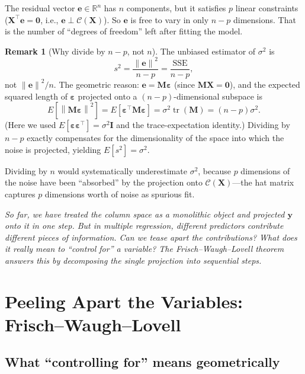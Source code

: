 \documentclass[11pt,a4paper]{article}
\theoremstyle{plain}
\theoremstyle{definition}
\newtheorem{remark}[theorem]{Remark}
\newcommand{\R}{\mathbb{R}}
\newcommand{\bX}{\bm{X}}
\newcommand{\by}{\bm{y}}
\newcommand{\be}{\bm{e}}
\newcommand{\bM}{\bm{M}}
\newcommand{\bI}{\bm{I}}
\newcommand{\Col}{\mathcal{C}}
\newcommand{\norm}[1]{\left\lVert #1 \right\rVert}
\DeclareMathOperator{\tr}{tr}
\begin{document}
The residual vector $\be\in\R^n$ has $n$ components, but it satisfies $p$
linear constraints ($\bX^\top\be = \bm{0}$, i.e., $\be\perp\Col(\bX)$).
So $\be$ is free to vary in only $n - p$ dimensions.
That is the number of ``degrees of freedom'' left after fitting the model.

\begin{remark}[Why divide by $n-p$, not $n$]
The unbiased estimator of $\sigma^2$ is
\[
  s^2 = \frac{\norm{\be}^2}{n - p} = \frac{\text{SSE}}{n-p},
\]
not $\norm{\be}^2/n$.  The geometric reason: $\be = \bM\bm{\varepsilon}$
(since $\bM\bX = \bm{0}$), and the expected squared length of
$\bm{\varepsilon}$ projected onto a $(n-p)$-dimensional subspace is
\[
  E[\norm{\bM\bm{\varepsilon}}^2]
  = E[\bm{\varepsilon}^\top\bM\bm{\varepsilon}]
  = \sigma^2\tr(\bM)
  = (n-p)\sigma^2.
\]
(Here we used $E[\bm{\varepsilon}\bm{\varepsilon}^\top] = \sigma^2\bI$
and the trace-expectation identity.)
Dividing by $n-p$ exactly compensates for the dimensionality of the
space into which the noise is projected, yielding $E[s^2] = \sigma^2$.

Dividing by $n$ would systematically underestimate $\sigma^2$, because
$p$ dimensions of the noise have been ``absorbed'' by the projection
onto $\Col(\bX)$---the hat matrix captures $p$ dimensions worth of noise
as spurious fit.
\end{remark}

\medskip
\noindent\textit{So far, we have treated the column space as a monolithic
object and projected $\by$ onto it in one step.
But in multiple regression, different predictors contribute different
pieces of information.
Can we tease apart the contributions?
What does it really mean to ``control for'' a variable?
The Frisch--Waugh--Lovell theorem answers this by decomposing the
single projection into sequential steps.}


\section{Peeling Apart the Variables: Frisch--Waugh--Lovell}\label{sec:fwl}

\subsection{What ``controlling for'' means geometrically}
\end{document}
